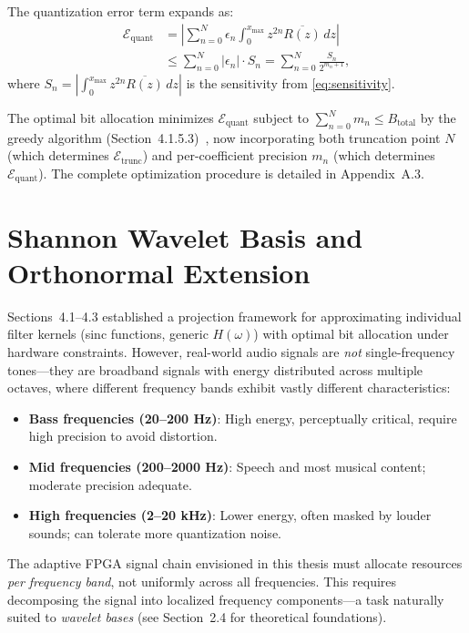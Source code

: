 The quantization error term expands as:
\begin{align}
\mathcal{E}_{\text{quant}} &= \left|\sum_{n=0}^{N} \epsilon_n \int_0^{x_{\max}} z^{2n} \overline{R(z)} \, dz\right| \nonumber\\
&\leq \sum_{n=0}^{N} |\epsilon_n| \cdot S_n = \sum_{n=0}^{N} \frac{S_n}{2^{m_n+1}},
\label{eq:quant_sensitivity_bound}
\end{align}
where $S_n = \left|\int_0^{x_{\max}} z^{2n} \overline{R(z)} \, dz\right|$ is the sensitivity from \eqref{eq:sensitivity}.

The optimal bit allocation minimizes $\mathcal{E}_{\text{quant}}$ subject to $\sum_{n=0}^{N} m_n \leq B_{\text{total}}$ by the greedy algorithm (Section~4.1.5.3)~\cite{VetterliKovacevic1995}, now incorporating both truncation point $N$ (which determines $\mathcal{E}_{\text{trunc}}$) and per-coefficient precision $m_n$ (which determines $\mathcal{E}_{\text{quant}}$). The complete optimization procedure is detailed in Appendix~A.3.

\section{Shannon Wavelet Basis and Orthonormal Extension}

Sections~4.1--4.3 established a projection framework for approximating individual filter kernels (sinc functions, generic $H(\omega)$) with optimal bit allocation under hardware constraints. However, real-world audio signals are \emph{not} single-frequency tones—they are broadband signals with energy distributed across multiple octaves, where different frequency bands exhibit vastly different characteristics:
\begin{itemize}
\item \textbf{Bass frequencies (20--200 Hz)}: High energy, perceptually critical, require high precision to avoid distortion.
\item \textbf{Mid frequencies (200--2000 Hz)}: Speech and most musical content; moderate precision adequate.
\item \textbf{High frequencies (2--20 kHz)}: Lower energy, often masked by louder sounds; can tolerate more quantization noise.
\end{itemize}

The adaptive FPGA signal chain envisioned in this thesis must allocate resources \emph{per frequency band}, not uniformly across all frequencies. This requires decomposing the signal into localized frequency components—a task naturally suited to \emph{wavelet bases} (see Section~2.4 for theoretical foundations).

